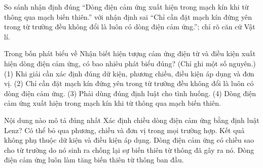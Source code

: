 \begin{bt}
So sánh nhận định đúng “Dòng điện cảm ứng xuất hiện trong mạch kín khi từ thông qua mạch biến thiên.” với nhận định sai “Chỉ cần đặt mạch kín đứng yên trong từ trường đều không đổi là luôn có dòng điện cảm ứng.”; chỉ rõ căn cứ Vật lí.
\end{bt}

\begin{ex}
Trong bốn phát biểu về Nhận biết hiện tượng cảm ứng điện từ và điều kiện xuất hiện dòng điện cảm ứng, có bao nhiêu phát biểu đúng? (Chỉ ghi một số nguyên.) (1) Khi giải cần xác định đúng dữ kiện, phương chiều, điều kiện áp dụng và đơn vị. (2) Chỉ cần đặt mạch kín đứng yên trong từ trường đều không đổi là luôn có dòng điện cảm ứng. (3) Phải dùng đúng định luật cho tình huống. (4) Dòng điện cảm ứng xuất hiện trong mạch kín khi từ thông qua mạch biến thiên.
\end{ex}

\begin{ex}
Nội dung nào mô tả đúng nhất Xác định chiều dòng điện cảm ứng bằng định luật Lenz?
\choice
{Có thể bỏ qua phương, chiều và đơn vị trong mọi trường hợp.}
{Kết quả không phụ thuộc dữ kiện và điều kiện áp dụng.}
{\True Dòng điện cảm ứng có chiều sao cho từ trường do nó sinh ra chống lại sự biến thiên từ thông đã gây ra nó.}
{Dòng điện cảm ứng luôn làm tăng biến thiên từ thông ban đầu.}
\end{ex}

